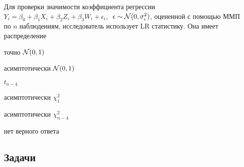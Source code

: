   
\begin{question}
Для проверки значимости коэффициента регрессии \( Y_i=\beta_0+\beta_1 X_{i} + \beta_2 Z_i + \beta_3 W_i + \epsilon_i\), 
\(\epsilon \sim \mathcal{N}(0,\sigma_\epsilon^2) \), 
оцененной с помощью ММП по \( n \) наблюдениям, 
исследователь использует LR статистику. Она имеет распределение
\begin{answerlist}
\item точно \( \mathcal{N}(0, 1) \)
\item асимптотически \( \mathcal{N}(0, 1) \)
\item $t_{n-4}$
\item асимптотически $\chi^2_{1}$
\item асимптотически $\chi^2_{n-4}$
\item нет верного ответа
\end{answerlist}
\end{question}
    

\subsection*{Задачи}

